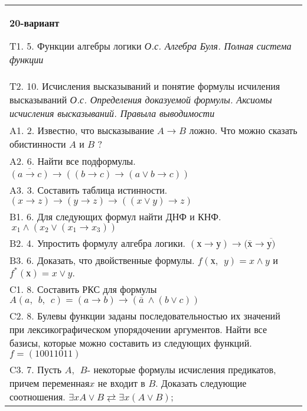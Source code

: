 \documentclass{article}
\begin{document}
\begin{tabular}{m{17cm}}
\textbf{20-вариант}
\newline

T1. 5. Функции алгебры логики \emph{О.с. Алгебра Буля. Полная система функции} \\
T2. 10. Исчисления высказываний и понятие формулы исчиления высказываний \emph{О.с. Определения доказуемой формулы. Аксиомы исчисления высказываний. Правыла выводимости} \\
A1. 2. Известно, что высказывание \(A \rightarrow B\) ложно. Что можно сказать обистинности \(A\) и \(B\) ? \\
A2. 6. Найти все подформулы. \(\overline{(a \rightarrow c)} \rightarrow \left( (b \rightarrow c) \rightarrow (a \vee b \rightarrow c) \right)\) \\
A3. 3. Составить таблица истинности. \((x \rightarrow z) \rightarrow (y \rightarrow z) \rightarrow ((x \vee y) \rightarrow z)\) \\
B1. 6. Для следующих формул найти ДНФ и КНФ. \(\ x_{1} \land (x_{2} \vee (x_{1} \rightarrow x_{3}))\) \\
B2. 4. Упростить формулу алгебра логики. \((х \rightarrow у) \rightarrow (\overline{х} \rightarrow \overline{у)}\) \\
B3. 6. Доказать, что двойственные формулы. \(f(х,\ \ y) = x \land y\) и \(f^{*}(х) = x \vee y.\) \\
C1. 8. Составить РКС для формулы \(A(a,\ \ b,\ \ c) = (a \rightarrow b) \rightarrow (\overline{a}\  \land (b \vee c))\) \\
C2. 8. Булевы функции заданы последовательностью их значений при лексикографическом упорядочении аргументов. Найти все базисы, которые можно составить из следующих функций. \(f = (10011011)\) \\
C3. 7. Пусть \(A,\ \ B\)- некоторые формулы исчисления предикатов, причем переменная\(x\) не входит в \(B\). Доказать следующие соотношения. \(\exists xA \vee B \rightleftarrows \exists x(A \vee B)\); \\

\end{tabular}
\vspace{1cm}
\end{document}
